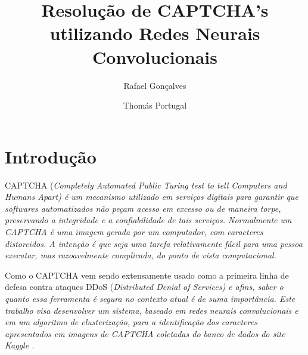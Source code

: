 \documentclass[11pt]{article}
\title{Resolução de CAPTCHA's utilizando Redes Neurais Convolucionais}
\author{Rafael Gonçalves \and Thomás Portugal}
\begin{document}

  \section{Introdu\c{c}\~{a}o}
  \label{sec:introducao}

CAPTCHA (\em Completely Automated Public Turing test to tell Computers and Humans Apart\em ) é um mecanismo utilizado em serviços digitais para garantir que softwares automatizados não peçam acesso em excesso ou de maneira torpe, preservando a integridade e a confiabilidade de tais serviços. Normalmente um CAPTCHA é uma imagem gerada por um computador, com caracteres distorcidos. A intenção é que seja uma tarefa relativamente fácil para uma pessoa executar, mas razoavelmente complicada, do ponto de vista computacional.

Como o CAPTCHA vem sendo extensamente usado como a primeira linha de defesa contra ataques DDoS (\em Distributed Denial of Services\em ) e afins, saber o quanto essa ferramenta é segura no contexto atual é de suma importância.
Este trabalho visa desenvolver um sistema, baseado em redes neurais convolucionais e em um algoritmo de clusterização, para a identificação dos caracteres apresentados em imagens de CAPTCHA coletadas do banco de dados do site Kaggle \cite{data}.
\end{document}
